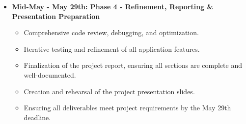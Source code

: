 \documentclass{article}
\begin{document}
\begin{itemize}
    \item \textbf{Mid-May - May 29th: Phase 4 - Refinement, Reporting \& Presentation Preparation}
    \begin{itemize}
        \item Comprehensive code review, debugging, and optimization.
        \item Iterative testing and refinement of all application features.
        \item Finalization of the project report, ensuring all sections are complete and well-documented.
        \item Creation and rehearsal of the project presentation slides.
        \item Ensuring all deliverables meet project requirements by the May 29th deadline.
    \end{itemize}
\end{itemize}
\clearpage

\tableofcontents
\clearpage

\end{document}
